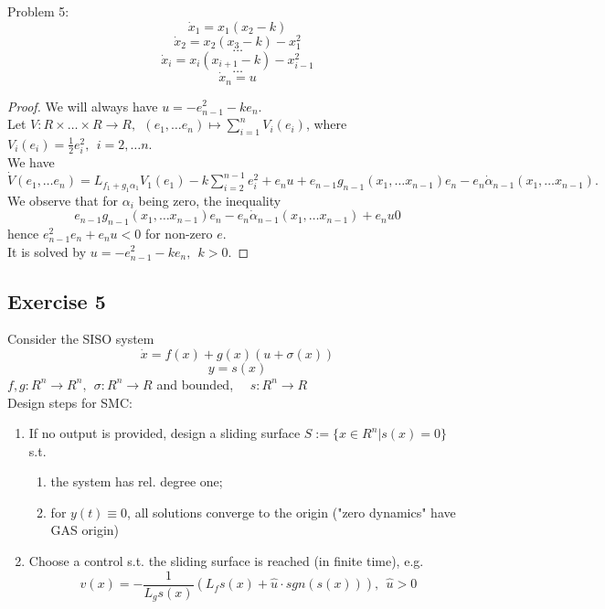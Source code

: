     Problem 5:
    $$\dot x_1 = x_1(x_2-k)$$
    $$\dot x_2 = x_2(x_3-k)-x_1^2$$
    $$\dots$$
    $$\dot x_i = x_i(x_{i+1}-k)-x_{i-1}^2$$
    $$\dots$$
    $$\dot x_n = u$$
    \begin{proof}
        We will always have $u = -e_{n-1}^2-ke_n$. \\
        Let $V: R \times \dots \times R \rightarrow R, \ \ (e_1, \dots e_n) \mapsto \sum_{i=1}^n V_i(e_i)$, where $V_i(e_i) = \frac{1}{2}e_i^2, \ \ i=2, \dots n$.\\
        We have $\dot V(e_1, \dots e_n) = L_{f_1+g_1\alpha_1}V_1(e_1)-k\sum_{i=2}^{n-1}e_i^2 + e_nu + e_{n-1}g_{n-1}(x_1, \dots x_{n-1})e_n - e_n \dot \alpha_{n-1}(x_1, \dots x_{n-1}).$\\
        We observe that for $\alpha_i$ being zero, the inequality
        $$e_{n-1}g_{n-1}(x_1, \dots x_{n-1})e_n - e_n \dot \alpha_{n-1} (x_1, \dots x_{n-1}) + e_nu  0$$
        hence $e_{n-1}^2e_n + e_nu < 0$ for non-zero $e$.\\
        It is solved by $u = -e_{n-1}^2 - ke_n, \ \ k>0$.
    \end{proof}
    
    \subsection{Exercise 5}
    
    Consider the SISO system
    $$\dot x = f(x)+g(x)(u+\sigma(x))$$
    $$y=s(x)$$
    $f,g: R^n \rightarrow R^n, \ \ \sigma: R^n \rightarrow R$ and bounded, \ \ $s: R^n \rightarrow R$\\
    
    Design steps for SMC:\\
    \begin{enumerate}
        \item If no output is provided, design a sliding surface $S:=\{x \in R^n|s(x)=0\}$ s.t.
        \begin{enumerate}[label=(\alph*)]
            \item the system has rel. degree one;
            \item for $y(t) \equiv 0$, all solutions converge to the origin ("zero dynamics" have GAS origin)
        \end{enumerate}
        \item Choose a control s.t. the sliding surface is reached (in finite time), e.g. \\
        $$v(x) = - \frac{1}{L_gs(x)}(L_fs(x)+ \hat u \cdot sgn(s(x))), \ \ \hat u > 0$$
    \end{enumerate}
    
